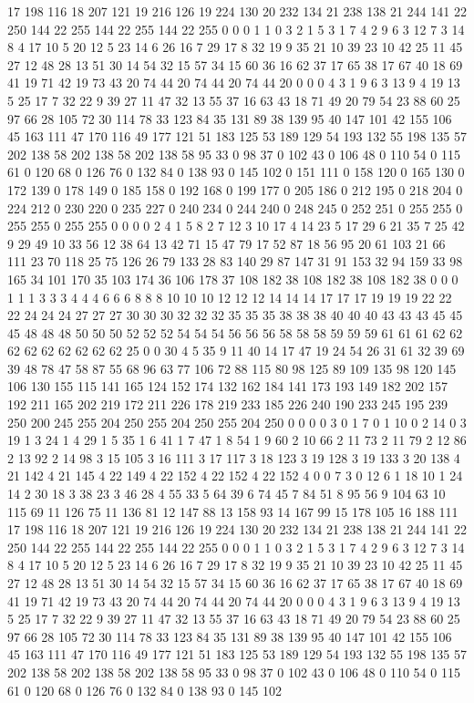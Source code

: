 17 198 116 18 207 121 19 216 126 19 224 130 20 232 134 21 238 138 21 244 141 22 250 144 22 255 144 22 255 144 22 255 0 0 0 1 1 0 3 2 1 5 3 1 7 4 2 9 6 3 12 7 3 14 8 4 17 10 5 20 12 5 23 14 6 26 16 7 29 17 8 32 19 9 35 21 10 39 23 10 42 25 11 45 27 12 48 28 13 51 30 14 54 32 15 57 34 15 60 36 16 62 37 17 65 38 17 67 40 18 69 41 19 71 42 19 73 43 20 74 44 20 74 44 20 74 44 20 0 0 0 4 3 1 9 6 3 13 9 4 19 13 5 25 17 7 32 22 9 39 27 11 47 32 13 55 37 16 63 43 18 71 49 20 79 54 23 88 60 25 97 66 28 105 72 30 114 78 33 123 84 35 131 89 38 139 95 40 147 101 42 155 106 45 163 111 47 170 116 49 177 121 51 183 125 53 189 129 54 193 132 55 198 135 57 202 138 58 202 138 58 202 138 58 95 33 0 98 37 0 102 43 0 106 48 0 110 54 0 115 61 0 120 68 0 126 76 0 132 84 0 138 93 0 145 102 
0 151 111 0 158 120 0 165 130 0 172 139 0 178 149 0 185 158 0 192 168 0 199 177 0 205 186 0 212 195 0 218 204 0 224 212 0 230 220 0 235 227 0 240 234 0 244 240 0 248 245 0 252 251 0 255 255 0 255 255 0 255 255 0 0 0 0 2 4 1 5 8 2 7 12 3 10 17 4 14 23 5 17 29 6 21 35 7 25 42 9 29 49 10 33 56 12 38 64 13 42 71 15 47 79 17 52 87 18 56 95 20 61 103 21 66 111 23 70 118 25 75 126 26 79 133 28 83 140 29 87 147 31 91 153 32 94 159 33 98 165 34 101 170 35 103 174 36 106 178 37 108 182 38 108 182 38 108 182 38 0 0 0 1 1 1 3 3 3 4 4 4 6 6 6 8 8 8 10 10 10 12 12 12 14 14 14 17 17 17 19 19 19 22 22 22 24 24 24 27 27 27 30 30 30 32 32 32 35 35 35 38 38 38 40 40 40 43 43 43 45 45 45 48 48 48 50 50 50 52 52 52 54 54 54 56 56 56 58 58 58 59 59 59 61 61 61 62 62 62 62 62 62 62 62 62 
25 0 0 30 4 5 35 9 11 40 14 17 47 19 24 54 26 31 61 32 39 69 39 48 78 47 58 87 55 68 96 63 77 106 72 88 115 80 98 125 89 109 135 98 120 145 106 130 155 115 141 165 124 152 174 132 162 184 141 173 193 149 182 202 157 192 211 165 202 219 172 211 226 178 219 233 185 226 240 190 233 245 195 239 250 200 245 255 204 250 255 204 250 255 204 250 0 0 0 0 3 0 1 7 0 1 10 0 2 14 0 3 19 1 3 24 1 4 29 1 5 35 1 6 41 1 7 47 1 8 54 1 9 60 2 10 66 2 11 73 2 11 79 2 12 86 2 13 92 2 14 98 3 15 105 3 16 111 3 17 117 3 18 123 3 19 128 3 19 133 3 20 138 4 21 142 4 21 145 4 22 149 4 22 152 4 22 152 4 22 152 4 0 0 7 3 0 12 6 1 18 10 1 24 14 2 30 18 3 38 23 3 46 28 4 55 33 5 64 39 6 74 45 7 84 51 8 95 56 9 104 63 10 115 69 11 126 75 11 136 81 12 147 88 13 158 93 14 167 99 15 178 105 16 188 111 
17 198 116 18 207 121 19 216 126 19 224 130 20 232 134 21 238 138 21 244 141 22 250 144 22 255 144 22 255 144 22 255 0 0 0 1 1 0 3 2 1 5 3 1 7 4 2 9 6 3 12 7 3 14 8 4 17 10 5 20 12 5 23 14 6 26 16 7 29 17 8 32 19 9 35 21 10 39 23 10 42 25 11 45 27 12 48 28 13 51 30 14 54 32 15 57 34 15 60 36 16 62 37 17 65 38 17 67 40 18 69 41 19 71 42 19 73 43 20 74 44 20 74 44 20 74 44 20 0 0 0 4 3 1 9 6 3 13 9 4 19 13 5 25 17 7 32 22 9 39 27 11 47 32 13 55 37 16 63 43 18 71 49 20 79 54 23 88 60 25 97 66 28 105 72 30 114 78 33 123 84 35 131 89 38 139 95 40 147 101 42 155 106 45 163 111 47 170 116 49 177 121 51 183 125 53 189 129 54 193 132 55 198 135 57 202 138 58 202 138 58 202 138 58 95 33 0 98 37 0 102 43 0 106 48 0 110 54 0 115 61 0 120 68 0 126 76 0 132 84 0 138 93 0 145 102 
